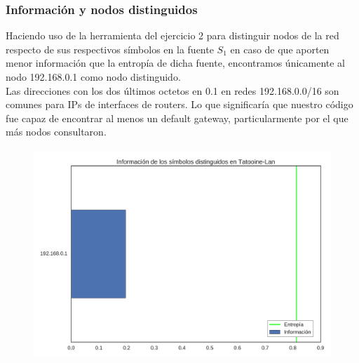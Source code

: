 \subsubsection{Información y nodos distinguidos}
Haciendo uso de la herramienta del ejercicio 2 para distinguir nodos de la red respecto de sus respectivos símbolos en la fuente $S_1$ en caso de que aporten menor información que la entropía de dicha fuente, encontramos únicamente al nodo 192.168.0.1 como nodo distinguido.
\\

Las direcciones con los dos últimos octetos en 0.1 en redes 192.168.0.0/16 son comunes para IPs de interfaces de routers. Lo que significaría que nuestro código fue capaz de encontrar al menos un default gateway, particularmente por el que más nodos consultaron.

\begin{figure}[H]
	\includegraphics[width=15cm, height=8cm]{../img/distinguidos-Tatooine-Lan.pdf}
\end{figure}
